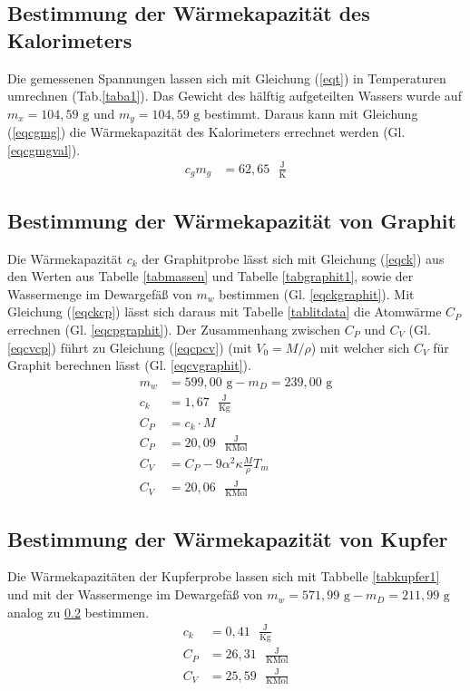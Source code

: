 \subsection{Bestimmung der Wärmekapazität des Kalorimeters}
 
Die gemessenen Spannungen lassen sich mit Gleichung (\ref{eqt}) in Temperaturen umrechnen (Tab.\ref{taba1}).
Das Gewicht des hälftig aufgeteilten Wassers wurde auf $m_x=104,59\text{ g}$ und \mbox{$m_y=104,59\text{ g}$} 
bestimmt. Daraus kann mit Gleichung (\ref{eqcgmg}) die Wärmekapazität des Kalorimeters errechnet werden 
(Gl. \ref{eqcgmgval}).
\begin{align}
	c_gm_g&=62,65\text{ }\frac{\text{J}}{\text{K}} \label{eqcgmgval}
\end{align}
\subsection{Bestimmung der Wärmekapazität von Graphit} \label{subsec:graphit}
 
Die Wärmekapazität $c_k$ der Graphitprobe lässt sich mit Gleichung (\ref{eqck}) aus den Werten aus
Tabelle \ref{tabmassen} und Tabelle \ref{tabgraphit1}, sowie der Wassermenge im Dewargefäß von $m_w$
bestimmen (Gl. \ref{eqckgraphit}). Mit Gleichung (\ref{eqckcp}) lässt
sich daraus mit Tabelle \ref{tablitdata} die Atomwärme $C_P$ errechnen (Gl. \ref{eqcpgraphit}).
Der Zusammenhang zwischen $C_P$ und $C_V$ (Gl. \ref{eqcvcp}) führt zu Gleichung (\ref{eqcpcv}) (mit 
$V_0=M/\rho$) mit welcher sich $C_V$ für Graphit berechnen lässt (Gl. \ref{eqcvgraphit}).
\begin{align}
m_w&=599,00\text{ g}-m_D=239,00\text{ g}\\
c_k&=1,67 \text{ }\frac{\text{J}}{\text{K} \text{g}} \label{eqckgraphit}\\
C_P&=c_k \cdot M \label{eqckcp} \\
C_P&=20,09 \text{ }\frac{\text{J}}{\text{K} \text{Mol}} \label{eqcpgraphit} \\
C_V&= C_P - 9 \alpha^2 \kappa \frac{M}{\rho} T_m \label{eqcpcv}\\
C_V&= 20,06 \text{ }\frac{\text{J}}{\text{K} \text{Mol}} \label{eqcvgraphit}
\end{align}
\subsection{Bestimmung der Wärmekapazität von Kupfer}

Die Wärmekapazitäten der Kupferprobe lassen sich mit Tabbelle \ref{tabkupfer1} und mit 
der Wassermenge im Dewargefäß von $m_w=571,99\text{ g}-m_D=211,99\text{ g}$ 
analog zu \ref{subsec:graphit} bestimmen.
\begin{align}
c_k&=0,41 \text{ }\frac{\text{J}}{\text{K} \text{g}} \\
C_P&=26,31 \text{ }\frac{\text{J}}{\text{K} \text{Mol}} \\
C_V&=25,59  \text{ }\frac{\text{J}}{\text{K} \text{Mol}} 
\end{align}

